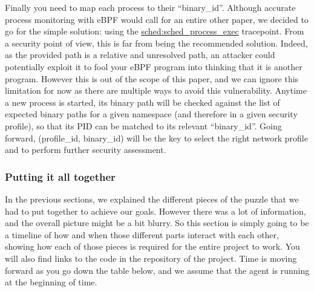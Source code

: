 Finally you need to map each process to their “binary\_id”. Although accurate process monitoring with eBPF would call for an entire other paper, we decided to go for the simple solution: using the \url{sched:sched_process_exec} tracepoint. From a security point of view, this is far from being the recommended solution. Indeed, as the provided path is a relative and unresolved path, an attacker could potentially exploit it to fool your eBPF program into thinking that it is another program. However this is out of the scope of this paper, and we can ignore this limitation for now as there are multiple ways to avoid this vulnerability. Anytime a new process is started, its binary path will be checked against the list of expected binary paths for a given namespace (and therefore in a given security profile), so that its PID can be matched to its relevant “binary\_id”. Going forward, (profile\_id, binary\_id) will be the key to select the right network profile and to perform further security assessment.

\subsubsection{Putting it all together}

In the previous sections, we explained the different pieces of the puzzle that we had to put together to achieve our goals. However there was a lot of information, and the overall picture might be a bit blurry. So this section is simply going to be a timeline of how and when those different parts interact with each other, showing how each of those pieces is required for the entire project to work. You will also find links to the code in the repository of the project. Time is moving forward as you go down the table below, and we assume that the agent is running at the beginning of time.

